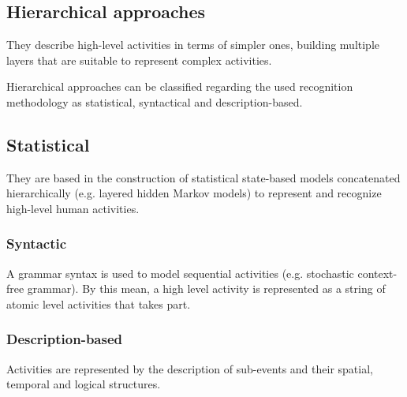 \documentclass[a4paper, 12pt, openany, oneside]{book}
\begin{document}
\subsection{Hierarchical approaches}
They describe high-level activities in terms of simpler ones, building multiple layers that are suitable to represent complex activities.

Hierarchical approaches can be classified regarding the used recognition methodology as statistical, syntactical and description-based.

\subsection{Statistical}
They are based in the construction of statistical state-based models concatenated hierarchically (e.g. layered hidden Markov models) to represent and recognize high-level human activities.

\subsubsection{Syntactic}
A grammar syntax is used to model sequential activities (e.g. stochastic context-free grammar). 
By this mean, a high level activity is represented as a string of atomic level activities that takes part.

\subsubsection{Description-based}
Activities are represented by the description of sub-events and their spatial, temporal and logical structures.





\end{document}
